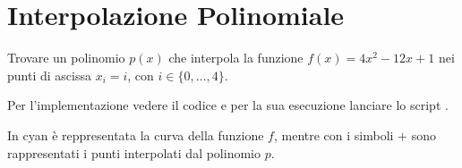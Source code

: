 \section{Interpolazione Polinomiale} 

\begin{exercise}[4.1] 
Trovare un polinomio $p(x)$ che interpola la funzione $f(x) = 4x^{2} -12x +1$
nei punti di ascissa $x_{i} = i$, con $ i \in \{ 0,\ldots, 4 \}$.
\end{exercise}
Per l'implementazione vedere il codice  e per la 
sua esecuzione lanciare lo script .
\begin{center} 

\end{center}
In cyan \`e reppresentata la curva della funzione $f$, mentre con i simboli
$+$ sono rappresentati i punti interpolati dal polinomio $p$.